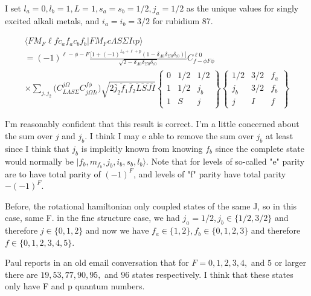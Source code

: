 \documentclass[prl, longbibliography]{revtex4-2}
\begin{document}
I set $l_a=0, l_b=1, L=1, s_a=s_b=1/2,j_a=1/2$ as the unique values for singly excited alkali metals, and $i_a=i_b=3/2$ for rubidium 87.

\begin{equation}
\begin{split}
\langle F M_F \ell f c_a f_a c_b f_b |F M_F c \Lambda S \Sigma I \iota p\rangle
\\
= 
(-1)^{\ell-\phi-F}
\frac{\Big[1+(-1)^{L_b+\ell+p}(1-\delta_{\Lambda 0}\delta_{\Sigma 0} \delta_{\iota 0})\Big]}
{\sqrt{2-\delta_{\Lambda 0}\delta_{\Sigma 0} \delta_{\iota 0}}} 
C_{f -\phi F \phi}^{\ell 0} 
\\
\times\sum_{j, j_2} 
\bigg(
C_{L\Lambda S\Sigma}^{j\Omega} 
C_{j\Omega I \iota}^{f \phi}
\bigg)
\sqrt{2\breve{j_2}\breve{f}_1\breve{f_2}
\breve{L}\breve{S}\breve{J}\breve{I}}
\begin{Bmatrix}
0 & 1/2 & 1/2\\
1 & 1/2 & j_b\\
1 & S & j
\end{Bmatrix}
\begin{Bmatrix}
1/2 & 3/2 & f_a\\
j_b & 3/2 & f_b\\
j & I & f
\end{Bmatrix}
\end{split}
\end{equation}

I'm reasonably confident that this result is correct. I'm a little concerned about the sum over $j$ and $j_b$. I think I may e able to remove the sum over $j_b$ at least since I think that $j_b$ is implcitly known from knowing $f_b$ since the complete state would normally be $|f_b, m_{f_b}, j_b, i_b, s_b, l_b\rangle$. Note that for levels of so-called "e" parity are to have total parity of $(-1)^F$, and levels of "f" parity have total parity $-(-1)^F$.  

Before, the rotational hamiltonian only coupled states of the same J, so in this case, same F. in the fine structure case, we had $j_a=1/2, j_b\in\{1/2,3/2\}$ and therefore $j\in\{0,1,2\}$ and now we have $f_a\in\{1,2\}, f_b\in\{0,1,2,3\}$ and therefore $f\in\{0,1,2,3,4,5\}$. 

Paul reports in an old email conversation that for $F=0,1,2,3,4, $ and $5$ or larger there are $19, 53, 77, 90, 95, $ and $96$ states respectively. I think that these states only have F and p quantum numbers. 

 

\end{document}
